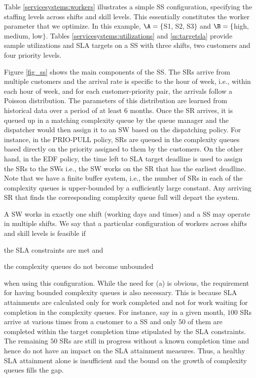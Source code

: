 \documentclass[11pt,letterpaper,english]{article}
\begin{document}
Table \ref{servicesystems:workers} illustrates a
simple SS configuration, specifying the staffing levels across shifts
and skill levels. This essentially constitutes the worker parameter
that we optimize. In this example, $\A = \{$S1, S2,
S3$\}$ and $\B=\{$high, medium, low$\}$. Tables
\ref{servicesystems:utilizations} and
\ref{ss:targetsla} provide sample
utilizations and SLA targets on a SS with three shifts, two
customers and four priority levels.



Figure \ref{fig_ss} shows the main components of the SS. The SRs
arrive from multiple customers and the arrival rate is specific to the
hour of week, i.e., within each hour of week, and for each
customer-priority pair, the arrivals follow a Poisson
distribution.  The parameters of this distribution are learned from
historical data over a period of at least $6$ months.  Once the SR
arrives, it is queued up in a matching complexity queue by the queue
manager and the dispatcher would then assign it to an SW based on the
dispatching policy.  For instance, in the PRIO-PULL policy, SRs are
queued in the complexity queues based directly on the priority
assigned to them by the customers. On the other hand, in the EDF
policy, the time left to SLA target deadline is used to assign the SRs
to the SWs i.e., the SW works on the SR that has the earliest
deadline. Note that we have a finite buffer system, i.e., the number of SRs in each of the 
complexity queues is upper-bounded by a sufficiently large constant. Any arriving SR that finds the corresponding complexity queue full will depart the system.

A SW works in exactly one shift (working days and times) and a SS may operate in multiple shifts.
We say that a particular configuration of workers across shifts and skill levels is feasible if 
\begin{inparaenum}[(a)]
\item the SLA constraints are met and
\item the complexity queues do not become unbounded
\end{inparaenum}
when using this configuration.
While the need for (a) is obvious, the requirement for having bounded complexity queues is also necessary. This is because SLA attainments are calculated only for work completed and not for work waiting for completion in the complexity queues. For instance, say in a given month, $100$ SRs arrive at various times from a customer to a SS and only $50$ of them are completed within the target completion time stipulated by the SLA constraints. The remaining $50$ SRs are still in progress without a known completion time and hence do not have an impact on the SLA attainment measures. Thus, a healthy SLA attainment alone is insufficient and 
the bound on the growth of complexity queues fills the gap.
\end{document}
